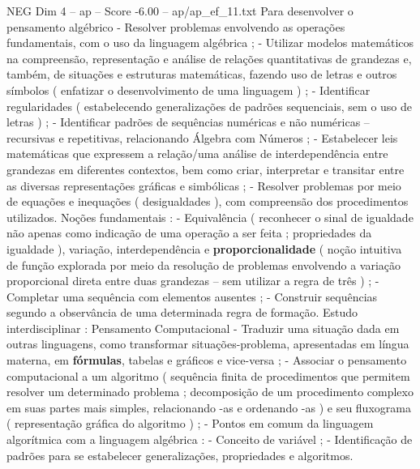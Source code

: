 \begin{textsample}{NEG Dim 4 – ap – Score -6.00 – ap/ap\_ef\_11.txt}
Para desenvolver o pensamento algébrico - Resolver problemas envolvendo as operações fundamentais, com o uso da linguagem algébrica ; - Utilizar modelos matemáticos na compreensão, representação e análise de relações quantitativas de grandezas e, também, de situações e estruturas matemáticas, fazendo uso de letras e outros símbolos ( enfatizar o desenvolvimento de uma linguagem ) ; - Identificar regularidades ( estabelecendo generalizações de padrões sequenciais, sem o uso de letras ) ; - Identificar padrões de sequências numéricas e não numéricas – recursivas e repetitivas, relacionando Álgebra com Números ; - Estabelecer leis matemáticas que expressem a relação/uma análise de interdependência entre grandezas em diferentes contextos, bem como criar, interpretar e transitar entre as diversas representações gráficas e simbólicas ; - Resolver problemas por meio de equações e inequações ( desigualdades ), com compreensão dos procedimentos utilizados.
Noções fundamentais : - Equivalência ( reconhecer o sinal de igualdade não apenas como indicação de uma operação a ser feita ; propriedades da igualdade ), variação, interdependência e \textbf{proporcionalidade} ( noção intuitiva de função explorada por meio da resolução de problemas envolvendo a variação proporcional direta entre duas grandezas – sem utilizar a regra de três ) ; - Completar uma sequência com elementos ausentes ; - Construir sequências segundo a observância de uma determinada regra de formação.
Estudo interdisciplinar : Pensamento Computacional - Traduzir uma situação dada em outras linguagens, como transformar situações-problema, apresentadas em língua materna, em \textbf{fórmulas}, tabelas e gráficos e vice-versa ; - Associar o pensamento computacional a um algoritmo ( sequência finita de procedimentos que permitem resolver um determinado problema ; decomposição de um procedimento complexo em suas partes mais simples, relacionando -as e ordenando -as ) e seu fluxograma ( representação gráfica do algoritmo ) ; - Pontos em comum da linguagem algorítmica com a linguagem algébrica : - Conceito de variável ; - Identificação de padrões para se estabelecer generalizações, propriedades e algoritmos.

\end{textsample}
